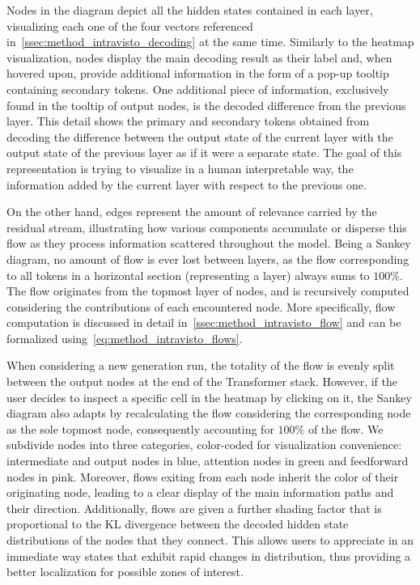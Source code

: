 Nodes in the diagram depict all the hidden states contained in each layer, visualizing each one of the four vectors referenced in~\cref{ssec:method_intravisto_decoding} at the same time.
Similarly to the heatmap visualization, nodes display the main decoding result as their label and, when hovered upon, provide additional information in the form of a pop-up tooltip containing secondary tokens.
One additional piece of information, exclusively found in the tooltip of output nodes, is the decoded difference from the previous layer.
This detail shows the primary and secondary tokens obtained from decoding the difference between the output state of the current layer with the output state of the previous layer as if it were a separate state.
The goal of this representation is trying to visualize in a human interpretable way, the information added by the current layer with respect to the previous one.

On the other hand, edges represent the amount of relevance carried by the residual stream, illustrating how various components accumulate or disperse this flow as they process information scattered throughout the model.
Being a Sankey diagram, no amount of flow is ever lost between layers, as the flow corresponding to all tokens in a horizontal section (representing a layer) always sums to $100\%$.
The flow originates from the topmost layer of nodes, and is recursively computed considering the contributions of each encountered node.
More specifically, flow computation is discussed in detail in~\cref{ssec:method_intravisto_flow} and can be formalized using~\cref{eq:method_intravisto_flows}.

When considering a new generation run, the totality of the flow is evenly split between the output nodes at the end of the Transformer stack.
However, if the user decides to inspect a specific cell in the heatmap by clicking on it, the Sankey diagram also adapts by recalculating the flow considering the corresponding node as the sole topmost node, consequently accounting for $100\%$ of the flow.
We subdivide nodes into three categories, color-coded for visualization convenience: intermediate and output nodes in blue, attention nodes in green and feedforward nodes in pink.
Moreover, flows exiting from each node inherit the color of their originating node, leading to a clear display of the main information paths and their direction.
Additionally, flows are given a further shading factor that is proportional to the KL divergence between the decoded hidden state distributions of the nodes that they connect.
This allows users to appreciate in an immediate way states that exhibit rapid changes in distribution, thus providing a better localization for possible zones of interest.

